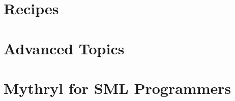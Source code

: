 \section{Recipes}

\cutend*

\section{Advanced Topics}

\cutend*


\section{Mythryl for SML Programmers}

\cutend*



